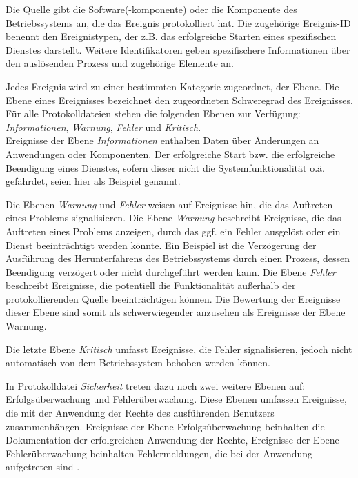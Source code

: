 Die Quelle gibt die Software(-komponente) oder die Komponente des Betriebssystems an, die das Ereignis protokolliert hat. Die zugehörige Ereignis-ID benennt den Ereignistypen, der z.B. das erfolgreiche Starten eines spezifischen Dienstes darstellt. Weitere Identifikatoren geben spezifischere Informationen über den auslösenden Prozess und zugehörige Elemente an.


Jedes Ereignis wird zu einer bestimmten Kategorie zugeordnet, der Ebene. Die Ebene eines Ereignisses bezeichnet den zugeordneten Schweregrad des Ereignisses. Für alle Protokolldateien stehen die folgenden Ebenen zur Verfügung: \textit{Informationen}, \textit{Warnung}, \textit{Fehler} und \textit{Kritisch}. \\


Ereignisse der Ebene \textit{Informationen} enthalten Daten über Änderungen an Anwendungen oder Komponenten. Der erfolgreiche Start bzw. die erfolgreiche Beendigung eines Dienstes, sofern dieser nicht die Systemfunktionalität o.ä. gefährdet, seien hier als Beispiel genannt. 

Die Ebenen \textit{Warnung} und \textit{Fehler} weisen auf Ereignisse hin, die das Auftreten eines Problems signalisieren.
Die Ebene \textit{Warnung} beschreibt Ereignisse, die das Auftreten eines Problems anzeigen, durch das ggf. ein Fehler ausgelöst oder ein Dienst beeinträchtigt werden könnte. Ein Beispiel ist die Verzögerung der Ausführung des Herunterfahrens des Betriebssystems durch einen Prozess, dessen Beendigung verzögert oder nicht durchgeführt werden kann. Die Ebene \textit{Fehler} beschreibt Ereignisse, die potentiell die Funktionalität außerhalb der protokollierenden Quelle beeinträchtigen können. Die Bewertung der Ereignisse dieser Ebene sind somit als schwerwiegender anzusehen als Ereignisse der Ebene Warnung.


Die letzte Ebene \textit{Kritisch} umfasst Ereignisse, die Fehler signalisieren, jedoch nicht automatisch von dem Betriebssystem behoben werden können. 

In Protokolldatei \textit{Sicherheit} treten dazu noch zwei weitere Ebenen auf: \glqq Erfolgsüberwachung\grqq{} und \glqq Fehlerüberwachung\grqq . Diese Ebenen umfassen Ereignisse, die mit der Anwendung der Rechte des ausführenden Benutzers zusammenhängen. Ereignisse der Ebene Erfolgsüberwachung beinhalten die Dokumentation der erfolgreichen Anwendung der Rechte, Ereignisse der Ebene Fehlerüberwachung beinhalten Fehlermeldungen, die bei der Anwendung aufgetreten sind \citep{MS1}.

